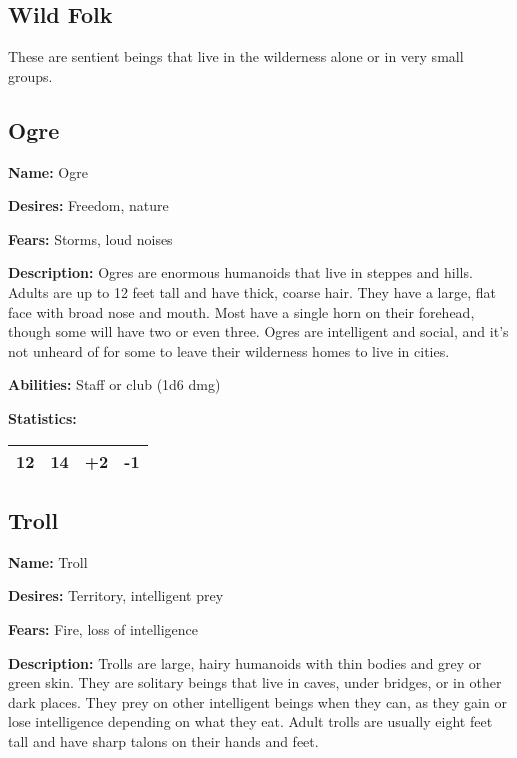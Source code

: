 \begin{multicols}{2}
\section{Wild Folk}

These are sentient beings that live in the wilderness alone or
in very small groups.

\subsection{Ogre}

\textbf{Name:} Ogre

\textbf{Desires:} Freedom, nature

\textbf{Fears:} Storms, loud noises

\textbf{Description:} Ogres are enormous humanoids that live in steppes and hills. Adults
are up to 12 feet tall and have thick, coarse hair. They have a large, flat face with broad
nose and mouth. Most have a single horn on their forehead, though some will have two or even
three. Ogres are intelligent and social, and it's not unheard of for some to leave their
wilderness homes to live in cities.

\textbf{Abilities:} Staff or club (1d6 dmg)

\textbf{Statistics:}

\begin{center}
{
\begin{xtabular}{|l|l|l|l|}
12 & 14 & +2 & -1 \\
\hline
\end{xtabular}
}
\end{center}

\subsection{Troll}

\textbf{Name:} Troll

\textbf{Desires:} Territory, intelligent prey

\textbf{Fears:} Fire, loss of intelligence

\textbf{Description:} Trolls are large, hairy humanoids with thin bodies and grey or green skin.
They are solitary beings that live in caves, under bridges, or in other dark places. They prey
on other intelligent beings when they can, as they gain or lose intelligence depending on what
they eat. Adult trolls are usually eight feet tall and have sharp talons on their hands and feet.


\end{multicols}
